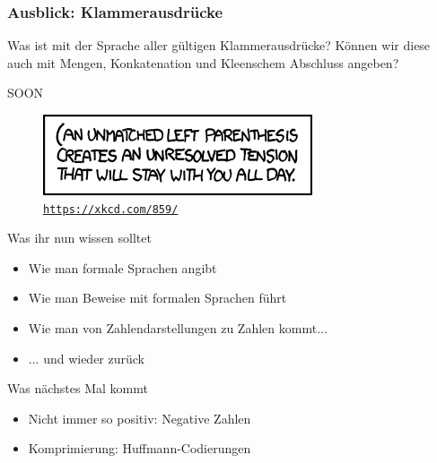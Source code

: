 



\begin{frame}
	\frametitle{Ausblick: Klammerausdrücke}
	
	Was ist mit der Sprache aller gültigen Klammerausdrücke? Können wir diese auch mit Mengen, Konkatenation und Kleenschem Abschluss angeben? \\[1em]
	\pause
	
	\begin{block}{}
		\Large
		\centering
		SOON\\[1em]
	\end{block}

	\begin{figure}[H]
		\centering
		\includegraphics[scale=0.7]{xkcd/(.png}
		\vspace{-7pt}
		\caption{ \texttt{\url{https://xkcd.com/859/}} }
	\end{figure}
\end{frame}



\begin{frame}	
	\begin{block}{Was ihr nun wissen solltet}
		\begin{itemize}
			\item Wie man formale Sprachen angibt
			\item Wie man Beweise mit formalen Sprachen führt
			\item Wie man von Zahlendarstellungen zu Zahlen kommt...
			\item ... und wieder zurück
		\end{itemize}
	\end{block}
	
	\begin{block}{Was nächstes Mal kommt}
		\begin{itemize}
			\item Nicht immer so positiv: Negative Zahlen
			\item Komprimierung: Huffmann-Codierungen
		\end{itemize}
	\end{block}
\end{frame}


\slideThanks


